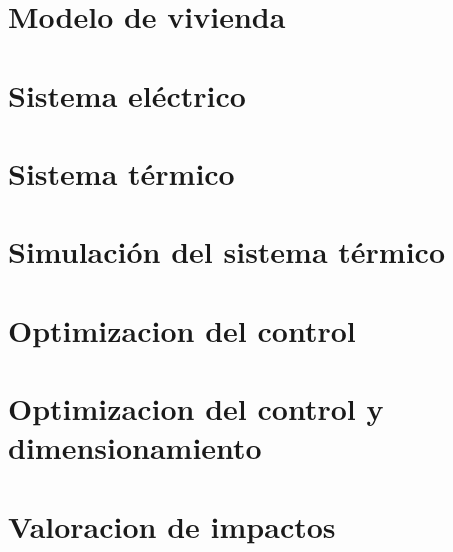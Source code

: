 \section{Modelo de vivienda}

\clearpage

\section{Sistema eléctrico}


\section{Sistema térmico}


\section{Simulación del sistema térmico}

\clearpage

\section{Optimizacion del control}

\clearpage

\section{Optimizacion del control y dimensionamiento}

\clearpage

\section{Valoracion de impactos}
